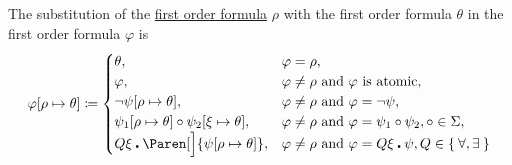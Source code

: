 \begin{definition}
\begin{DefEnum}
    The substitution of the \hyperref[def:first_order_syntax/formula]{first order formula} \( \rho \) with the first order formula \( \theta \) in the first order formula \( \varphi \) is
    \begin{equation}\label{eq:def:first_order_substitution/formula_in_formula}
      \varphi[\rho \mapsto \theta] \coloneqq \begin{cases}
        \theta,                                                       &\varphi = \rho, \\
        \varphi,                                                      &\varphi \neq \rho \T{and} \varphi \text{ is atomic}, \\
        \neg \psi[\rho \mapsto \theta],                               &\varphi \neq \rho \T{and} \varphi = \neg \psi, \\
        \psi_1[\rho \mapsto \theta] \circ \psi_2[\xi \mapsto \theta], &\varphi \neq \rho \T{and} \varphi = \psi_1 \circ \psi_2, \circ \in \Sigma, \\
        Q \xi \centerdot \Paren[\Big]{\psi[\rho \mapsto \theta]},     &\varphi \neq \rho \T{and} \varphi = Q \xi \centerdot \psi, Q \in \Set{ \forall, \exists }
      \end{cases}
    \end{equation}
  \end{DefEnum}
\end{definition}

